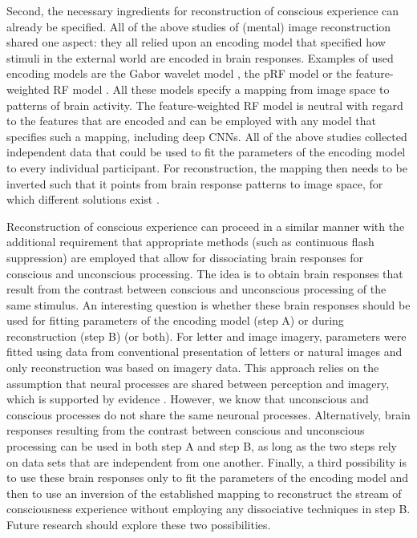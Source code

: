 Second, the necessary ingredients for reconstruction of conscious experience can already be specified. All of the above studies of (mental) image reconstruction shared one aspect: they all relied upon an encoding model that specified how stimuli in the external world are encoded in brain responses. Examples of used encoding models are the Gabor wavelet model \parencite{Kay2008}, the pRF model \parencite{Dumoulin2008} or the feature-weighted RF model \parencite{StYves2017}. All these models specify a mapping from image space to patterns of brain activity. The feature-weighted RF model is neutral with regard to the features that are encoded and can be employed with any model that specifies such a mapping, including deep CNNs. All of the above studies collected independent data that could be used to fit the parameters of the encoding model to every individual participant. For reconstruction, the mapping then needs to be inverted such that it points from brain response patterns to image space, for which different solutions exist \parencite{Naselaris2009, Rezende2014, Senden2018, StYves2019}.

Reconstruction of conscious experience can proceed in a similar manner with the additional requirement that appropriate methods (such as continuous flash suppression) are employed that allow for dissociating brain responses for conscious and unconscious processing. The idea is to obtain brain responses that result from the contrast between conscious and unconscious processing of the same stimulus. An interesting question is whether these brain responses should be used for fitting parameters of the encoding model (step A) or during reconstruction (step B) (or both). For letter and image imagery, parameters were fitted using data from conventional presentation of letters or natural images \parencite{Naselaris2015b, Senden2018} and only reconstruction was based on imagery data. This approach relies on the assumption that neural processes are shared between perception and imagery, which is supported by evidence \parencite{Pearson2015}. However, we know that unconscious and conscious processes do not share the same neuronal processes. Alternatively, brain responses resulting from the contrast between conscious and unconscious processing can be used in both step A and step B, as long as the two steps rely on data sets that are independent from one another. Finally, a third possibility is to use these brain responses only to fit the parameters of the encoding model and then to use an inversion of the established mapping to reconstruct the stream of consciousness experience without employing any dissociative techniques in step B. Future research should explore these two possibilities.

